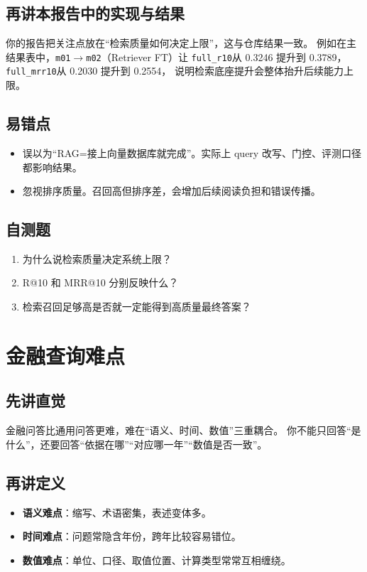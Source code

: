 \documentclass[UTF8,a4paper,12pt]{ctexart}
\begin{document}
\subsection{再讲本报告中的实现与结果}
你的报告把关注点放在“检索质量如何决定上限”，这与仓库结果一致。
例如在主结果表中，\texttt{m01$\rightarrow$m02}（Retriever FT）让
\texttt{full\_r10}从 0.3246 提升到 0.3789，\texttt{full\_mrr10}从 0.2030 提升到 0.2554，
说明检索底座提升会整体抬升后续能力上限。

\subsection{易错点}
\begin{itemize}
  \item 误以为“RAG=接上向量数据库就完成”。实际上 query 改写、门控、评测口径都影响结果。
  \item 忽视排序质量。召回高但排序差，会增加后续阅读负担和错误传播。
\end{itemize}

\subsection{自测题}
\begin{enumerate}
  \item 为什么说检索质量决定系统上限？
  \item R@10 和 MRR@10 分别反映什么？
  \item 检索召回足够高是否就一定能得到高质量最终答案？
\end{enumerate}

\section{金融查询难点}
\subsection{先讲直觉}
金融问答比通用问答更难，难在“语义、时间、数值”三重耦合。
你不能只回答“是什么”，还要回答“依据在哪”“对应哪一年”“数值是否一致”。

\subsection{再讲定义}
\begin{itemize}
  \item \textbf{语义难点}：缩写、术语密集，表述变体多。
  \item \textbf{时间难点}：问题常隐含年份，跨年比较容易错位。
  \item \textbf{数值难点}：单位、口径、取值位置、计算类型常常互相缠绕。
\end{itemize}
\end{document}
